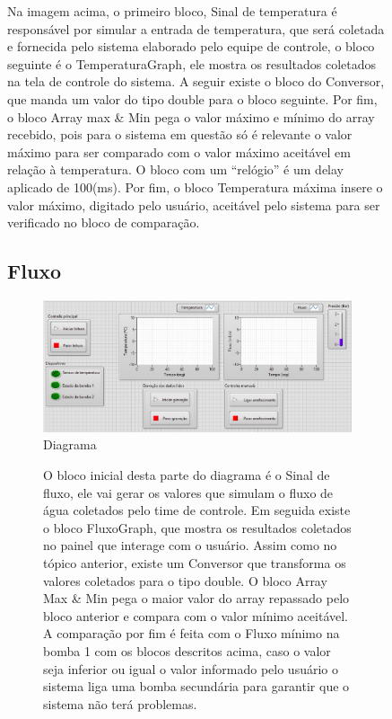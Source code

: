  \newpage\begin{figure}[!htb]  

 Na imagem acima, o primeiro bloco, Sinal de temperatura é responsável por simular a entrada de temperatura, que será coletada e fornecida pelo sistema elaborado pelo equipe de controle, o bloco seguinte é o TemperaturaGraph, ele mostra os resultados coletados na tela de controle do sistema. A seguir existe o bloco do Conversor, que manda um valor do tipo double para o bloco seguinte. Por fim, o bloco Array max \& Min pega o valor máximo e mínimo do array recebido, pois para o sistema em questão só é relevante o valor máximo para ser comparado com o valor máximo aceitável em relação à temperatura.
O bloco com um “relógio” é um delay aplicado de 100(ms). Por fim, o bloco Temperatura máxima insere o valor máximo, digitado pelo usuário, aceitável pelo sistema para ser verificado no bloco de comparação.

\subsection{Fluxo}


\begin{figure}[!htb]                                                               
    \centering                                                                      
    \includegraphics[scale=0.6, keepaspectratio=true]{figuras/labview_1.eps} 
    \caption{Diagrama }
 \end{figure}
 \newpage\begin{figure}[!htb]  

O bloco inicial desta parte do diagrama é o Sinal de fluxo, ele vai gerar os valores que simulam o fluxo de água coletados pelo time de controle. Em seguida existe o bloco FluxoGraph, que mostra os resultados coletados no painel que interage com o usuário.
    Assim como no tópico anterior, existe um Conversor que transforma os valores coletados para o tipo double. O bloco  Array Max \& Min pega o maior valor do array repassado pelo bloco anterior e compara com o valor mínimo aceitável.
    A comparação por fim é feita com o Fluxo mínimo na bomba 1 com os blocos descritos acima, caso o valor seja inferior ou igual o valor informado pelo usuário o sistema liga uma bomba secundária para garantir que o sistema não terá problemas.


\end{figure}
\end{figure}
